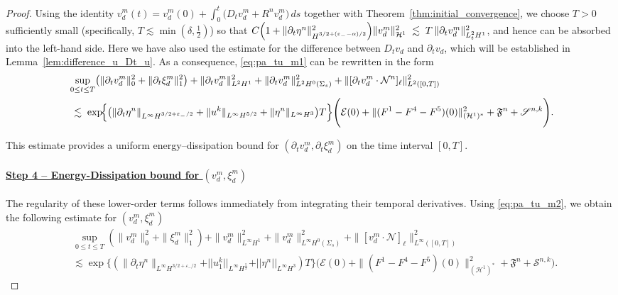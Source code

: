 \documentclass[letterpaper,reqno,10pt,twoside]{amsart}
\theoremstyle{definition}
\theoremstyle{remark}
\def\p{\partial}
\begin{document}
\begin{proof}
		Using the identity
		$ v_{d}^{m}(t)
		= v_{d}^{m}(0)
		+ \int_{0}^{t}\bigl(D_{t}v_{d}^{m}+R^{n}v_{d}^{m}\bigr)\,ds $
		together with Theorem~\ref{thm:initial_convergence}, we choose $T>0$ sufficiently
		small (specifically, $T\lesssim \min(\delta,\frac{1}{2})$) so that 
		$
		C\Bigl(1+\|\partial_{t}\eta^{n}\|_{H^{3/2+(\varepsilon_{-}-\alpha)/2}}^{2}\Bigr)
		\|v_{d}^{m}\|_{\mathcal{H}^{1}}^{2}
		\;\lesssim\; 
		T\,\|\partial_{t}v_{d}^{m}\|_{L_{t}^{2}H^{1}}^{2}$,
		and hence can be absorbed into the left-hand side. Here we have also used the estimate
		for the difference between $D_{t}v_{d}$ and $\partial_{t}v_{d}$, which will be
		established in Lemma~\ref{lem:difference_u_Dt_u}.
		As a consequence, \eqref{eq:pa_tu_m1} can be rewritten in the form 
		\begin{equation}\label{eq:pa_tu_m2}
			\begin{aligned}
				&\sup_{0\le t\le T}
				\bigl(
				\|\partial_{t}v_{d}^{m}\|_{0}^{2}
				+\|\partial_{t}\xi_{d}^{m}\|_{1}^{2}
				\bigr)
				+\|\partial_{t}v_{d}^{m}\|_{L^{2}H^{1}}^{2}
				+\|\partial_{t}v_{d}^{m}\|_{L^{2}H^{0}(\Sigma_{s})}^{2}
				+\|[\partial_{t}v_{d}^{m}\cdot\mathcal{N}^{n}]_{\ell}\|_{L^{2}([0,T])}^{2}
				\\
				&\;\lesssim\;
				\exp\!\Bigl\{
				\bigl(
				\|\partial_{t}\eta^{n}\|_{L^{\infty}H^{3/2+\varepsilon_{-}/2}}
				+\|u^{k}\|_{L^{\infty}H^{5/2}}
				+\|\eta^{n}\|_{L^{\infty}H^{3}}
				\bigr)T
				\Bigr\} \Bigg(\mathcal{E}(0)
				+\|(F^{1}-F^{4}-F^{5})(0)\|_{(\mathcal{H}^1)^{*}}^{2}+\mathfrak{F}^{n}+\mathscr{S}^{n, k}\Bigg).
			\end{aligned}
		\end{equation}
		
		
		This estimate provides a uniform energy–dissipation bound for
		$(\partial_{t}v_{d}^{m},\partial_{t}\xi_{d}^{m})$ on the time interval $[0,T]$.
		
		\paragraph{\underline{Step 4 -- Energy-Dissipation bound for $(v_{d}^{m},\xi_{d}^{m})$}}
		
		The regularity of these lower-order terms follows immediately from integrating their temporal derivatives. Using \eqref{eq:pa_tu_m2}, we obtain the following estimate for $(v_{d}^{m},\xi_{d}^{m})$
		\begin{equation}\label{eq:xi_m}
			\begin{aligned}
				&\sup_{0\le t\le T}(\|v_{d}^m\|_{0}^2+\|\xi_{d}^m\|_1^2)+\|v_{d}^m\|_{L^\infty H^1}^2+\|v_{d}^m\|_{L^\infty H^0(\Sigma_s)}^2+\|[v_{d}^m\cdot\mathcal{N}]_\ell\|_{L^\infty([0,T])}^2\\
				&\lesssim \exp\{(\|\p_t\eta^{n}\|_{L^\infty H^{3/2+\varepsilon_-/2}}+\vert \vert u_{1}^{k}\vert \vert_{L^{\infty}H^{\frac{5}{2}}}+\vert \vert \eta^{n}\vert \vert_{L^{\infty}H^{3}})T\}\Bigg(\mathcal{E}(0)
				+\|(F^{1}-F^{4}-F^{5})(0)\|_{(\mathcal{H}^1)^{*}}^{2}+\mathfrak{F}^{n}+\mathscr{S}^{n, k}\Bigg).
			\end{aligned}
		\end{equation}
		

\end{proof}
\end{document}
